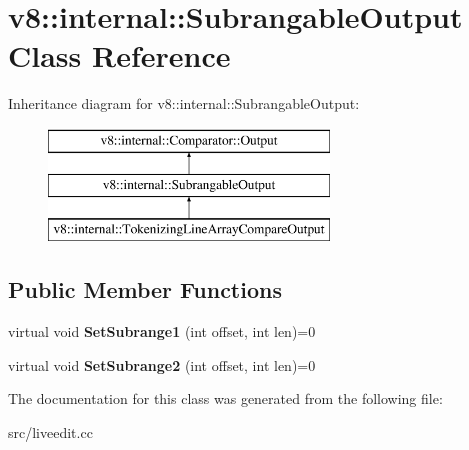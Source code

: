 \hypertarget{classv8_1_1internal_1_1_subrangable_output}{}\section{v8\+:\+:internal\+:\+:Subrangable\+Output Class Reference}
\label{classv8_1_1internal_1_1_subrangable_output}
Inheritance diagram for v8\+:\+:internal\+:\+:Subrangable\+Output\+:\begin{figure}[H]
\begin{center}
\leavevmode
\includegraphics[height=3.000000cm]{classv8_1_1internal_1_1_subrangable_output}
\end{center}
\end{figure}
\subsection*{Public Member Functions}
\begin{DoxyCompactItemize}
\item 
\hypertarget{classv8_1_1internal_1_1_subrangable_output_a3abce952c0063fb9cd020ddc77fa4eab}{}virtual void {\bfseries Set\+Subrange1} (int offset, int len)=0\label{classv8_1_1internal_1_1_subrangable_output_a3abce952c0063fb9cd020ddc77fa4eab}

\item 
\hypertarget{classv8_1_1internal_1_1_subrangable_output_a55616c6bcf552ceeb3eb3310a1841c72}{}virtual void {\bfseries Set\+Subrange2} (int offset, int len)=0\label{classv8_1_1internal_1_1_subrangable_output_a55616c6bcf552ceeb3eb3310a1841c72}

\end{DoxyCompactItemize}


The documentation for this class was generated from the following file\+:\begin{DoxyCompactItemize}
\item 
src/liveedit.\+cc\end{DoxyCompactItemize}

